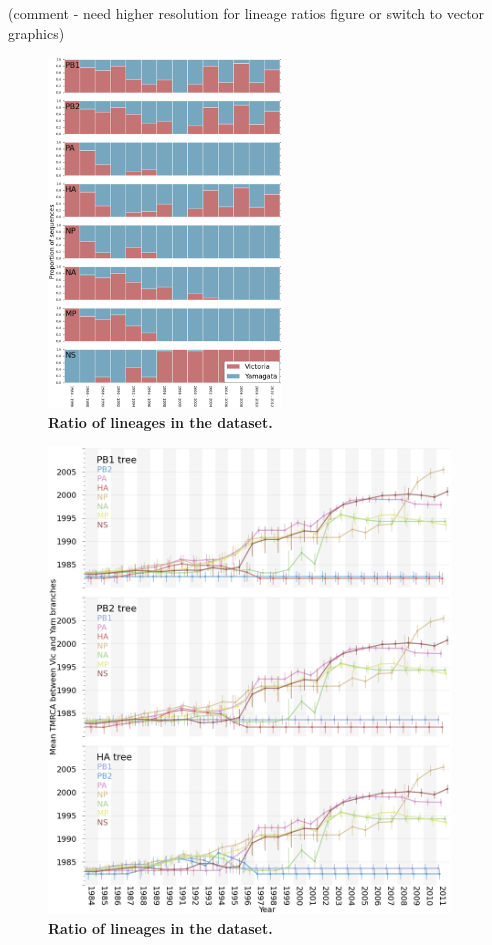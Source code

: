 \documentclass[11pt,oneside,letterpaper]{article}
\begin{document}
(comment - need higher resolution for lineage ratios figure or switch to vector graphics)
\begin{figure}[h]
	\centering		
	\includegraphics[width=0.55\textwidth]{figures/InfB_LineageRatiosOverTime.png}
	\caption{\textbf{Ratio of lineages in the dataset.}}
	\label{lineageRatios}
\end{figure}

\begin{figure}[h]
	\centering		
	\includegraphics[width=0.95\textwidth]{figures/InfB_betweenDiversity.png}
	\caption{\textbf{Ratio of lineages in the dataset.}}
	\label{betweenDiversity}
\end{figure}
\end{document}
